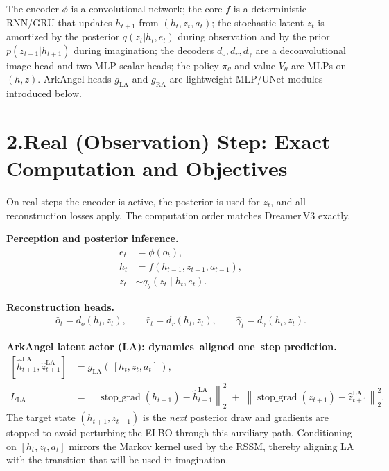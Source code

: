 \documentclass[11pt]{article}
\newcommand{\sg}{\operatorname{stop\_grad}}
\begin{document}
The encoder $\phi$ is a convolutional network; the core $f$ is a deterministic RNN/GRU that updates $h_{t+1}$ from $(h_t,z_t,a_t)$; the stochastic latent $z_t$ is amortized by the posterior $q(z_t|h_t,e_t)$ during observation and by the prior $p(z_{t+1}|h_{t+1})$ during imagination; the decoders $d_o,d_r,d_\gamma$ are a deconvolutional image head and two MLP scalar heads; the policy $\pi_\theta$ and value $V_\theta$ are MLPs on $(h,z)$. ArkAngel heads $g_{\mathrm{LA}}$ and $g_{\mathrm{RA}}$ are lightweight MLP/UNet modules introduced below.

\section*{2.\quad Real (Observation) Step: Exact Computation and Objectives}

On real steps the encoder is active, the posterior is used for $z_t$, and all reconstruction losses apply. The computation order matches Dreamer\,V3 exactly.

\textbf{Perception and posterior inference.}
\begin{align}
e_t &= \phi(o_t), \label{eq:enc} \\
h_t &= f(h_{t-1}, z_{t-1}, a_{t-1}), \label{eq:core} \\
z_t &\sim q_\theta\!\left(z_t \mid h_t, e_t\right). \label{eq:post}
\end{align}

\textbf{Reconstruction heads.}
\begin{align}
\hat o_t = d_o(h_t,z_t), \qquad \hat r_t = d_r(h_t,z_t), \qquad \hat\gamma_t = d_\gamma(h_t,z_t). \label{eq:decs}
\end{align}

\textbf{ArkAngel latent actor (LA): dynamics--aligned one--step prediction.}
\begin{align}
\left[\hat h_{t+1}^{\mathrm{LA}}, \hat z_{t+1}^{\mathrm{LA}}\right] &= g_{\mathrm{LA}}\!\left(\,[h_t, z_t, a_t]\,\right), \label{eq:la_pred}\\
L_{\mathrm{LA}} &= \left\| \sg(h_{t+1}) - \hat h_{t+1}^{\mathrm{LA}} \right\|_2^2 \;+\; \left\| \sg(z_{t+1}) - \hat z_{t+1}^{\mathrm{LA}} \right\|_2^2. \label{eq:la_loss}
\end{align}
The target state $(h_{t+1},z_{t+1})$ is the \emph{next} posterior draw and gradients are stopped to avoid perturbing the ELBO through this auxiliary path. Conditioning on $[h_t,z_t,a_t]$ mirrors the Markov kernel used by the RSSM, thereby aligning LA with the transition that will be used in imagination.
\end{document}
